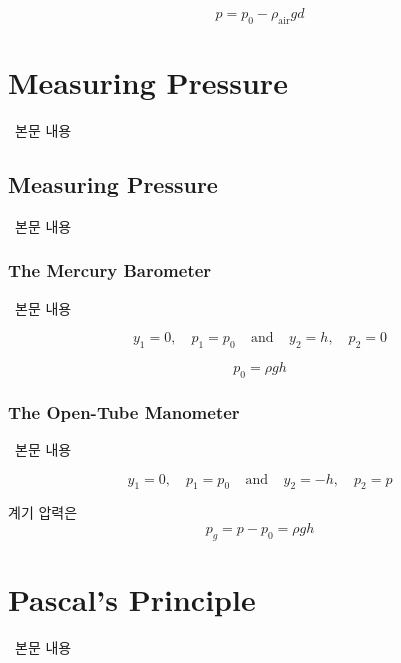 \begin{equation*} p = p_0 - \rho_{\text{air}} g d \end{equation*}

\section{Measuring Pressure}
%
\ 본문 내용

\subsection{Measuring Pressure}
%
\ 본문 내용

\subsubsection{The Mercury Barometer}
%
\ 본문 내용

\begin{equation*} y_1 = 0, \quad p_1 = p_0 ~~~~~ \text{and} ~~~~~ y_2 = h, \quad p_2 = 0 \end{equation*}

\begin{equation} p_0 = \rho g h \end{equation}

\subsubsection{The Open-Tube Manometer}
%
\ 본문 내용

\begin{equation*} y_1 = 0, \quad p_1 = p_0 ~~~~~ \text{and} ~~~~~ y_2 = -h, \quad p_2 = p \end{equation*}

계기 압력은
\begin{equation} p_g = p - p_0 = \rho g h
\label{eq:gauge_pressure}\end{equation}




\section{Pascal's Principle}
%
\ 본문 내용

